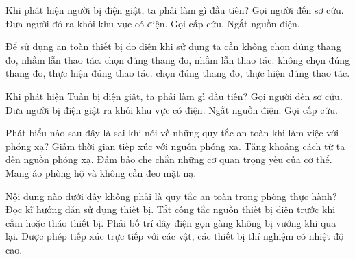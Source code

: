 
\begin{ex}
Khi phát hiện người bị điện giật, ta phải làm gì đầu tiên?
\choice
{Gọi người đến sơ cứu.}
{Đưa người đó ra khỏi khu vực có điện.}
{Gọi cấp cứu.}
{\True Ngắt nguồn điện.}
\end{ex}

\begin{ex}
Để sử dụng an toàn thiết bị đo điện khi sử dụng ta cần
\choice
{không chọn đúng thang đo, nhầm lẫn thao tác.}
{chọn đúng thang đo, nhầm lẫn thao tác.}
{không chọn đúng thang đo, thực hiện đúng thao tác.}
{\True chọn đúng thang đo, thực hiện đúng thao tác.}
\end{ex}


\begin{ex}
Khi phát hiện Tuấn bị điện giật, ta phải làm gì đầu tiên?
\choice
{Gọi người đến sơ cứu.}
{Đưa người bị điện giật ra khỏi khu vực có điện.}
{\True Ngắt nguồn điện.}
{Gọi cấp cứu.}
\end{ex}


\begin{ex}
Phát biểu nào sau đây là sai khi nói về những quy tắc an toàn khi làm việc với phóng xạ?
\choice
{Giảm thời gian tiếp xúc với nguồn phóng xạ.}
{Tăng khoảng cách từ ta đến nguồn phóng xạ.}
{Đảm bảo che chắn những cơ quan trọng yếu của cơ thể.}
{\True Mang áo phòng hộ và không cần đeo mặt nạ.}
\end{ex}

\begin{ex}
Nội dung nào dưới đây không phải là quy tắc an toàn trong phòng thực hành?
\choice
{Đọc kĩ hướng dẫn sử dụng thiết bị.}
{Tắt công tắc nguồn thiết bị điện trước khi cắm hoặc tháo thiết bị.}
{Phải bố trí dây điện gọn gàng không bị vướng khi qua lại.}
{\True Được phép tiếp xúc trực tiếp với các vật, các thiết bị thí nghiệm có nhiệt độ cao.}
\end{ex}

